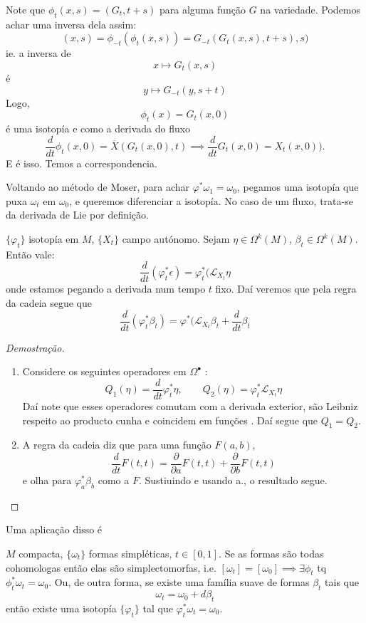 Note que $\phi_t(x,s)=(G_t,t+s)$ para alguma fun\c c\~ao $G$ na variedade. Podemos achar uma inversa dela assim:
\[(x,s)=\phi_{-t}(\phi_t(x,s))=G_{-t}(G_t(x,s),t+s),s)\]
ie. a inversa de
\[x\mapsto G_t(x,s)\]
\'e
\[y\mapsto G_{-t}(y,s+t)\]
Logo, 
\[\phi_t(x)=G_t(x,0)\]
\'e uma isotop\'ia e como a derivada do fluxo
\[\frac{d}{dt}\phi_t(x,0)=\overline{X}(G_t(x,0),t)\implies \frac{d}{dt}G_t(x,0)=X_t(x,0)).\]
E \'e isso. Temos a correspondencia.

Voltando ao m\'etodo de Moser, para achar $\varphi^*\omega_1=\omega_0$, pegamos uma isotop\'ia que puxa $\omega_t$ em $\omega_0$, e queremos diferenciar a isotop\'ia. No caso de um fluxo, trata-se da derivada de Lie por defini\c c\~ao.

\begin{lemma}
	$\{\varphi_t\}$ isotop\'ia em $M$, $\{X_t\}$ campo aut\'onomo. Sejam $\eta\in\Omega^k(M)$, $\beta_t\in\Omega^k(M)$. Ent\~ao vale:
	\[\frac{d}{dt}(\varphi^*_t\epsilon)=\varphi^*_t(\mathcal{L}_{X_t}\eta\]
	onde estamos pegando a derivada num tempo $t$ fixo. Da\'i veremos que pela regra da cadeia segue que
	\[\frac{d}{dt}(\varphi^*_t\beta_t)=\varphi^* (\mathcal{L}_{X_t}\beta_t+\frac{d}{dt}\beta_t\]
\end{lemma}

\begin{proof}[Demostra\c c\~ao]
	\begin{enumerate}[label=\alph*.]
		\item Considere os seguintes operadores em $\Omega^\bullet$ :
			\[Q_1(\eta)=\frac{d}{dt}\varphi^*_t\eta,\qquad Q_2(\eta)=\varphi^*_t\mathcal{L}_{X_t}\eta\]
			Da\'i note que esses operadores comutam com a derivada exterior, s\~ao Leibniz respeito ao producto cunha e coincidem em fun\c c\~oes . Da\'i segue que $Q_1=Q_2$.

		\item A regra da cadeia diz que para uma fun\c c\~ao $F(a,b)$,
\[\frac{d}{dt}F(t,t)=\frac{\partial}{\partial a}F(t,t)+\frac{\partial}{\partial b}F(t,t)\]
e olha para $\varphi^*_a\beta_b$ como a $F$. Sustiuindo e usando  a., o resultado segue.
	\end{enumerate}
\end{proof}

Uma aplica\c c\~ao disso \'e

\begin{thm}\leavevmode
	$M$ compacta, $\{\omega_t\}$ formas simpl\'eticas, $t\in [0,1]$. Se as formas s\~ao todas cohomologas ent\~ao elas s\~ao simplectomorfas, i.e. $[\omega_t]=[\omega_0]\implies \exists \phi_t$ tq $\phi^*_t\omega_t=\omega_0$. Ou, de outra forma, se existe uma fam\'ilia suave de formas $\beta_t$ tais que
	 \[\omega_t=\omega_0+d\beta_t\]
	 ent\~ao existe uma isotop\'ia $\{\varphi_t\}$ tal que $\varphi^*_t\omega_t=\omega_0$.
\end{thm}

